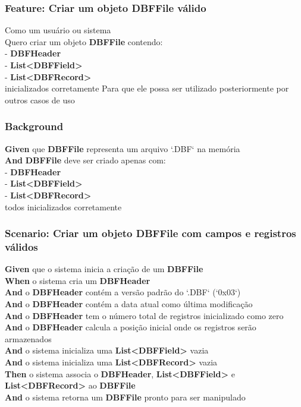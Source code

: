 \subsubsection{Feature: Criar um objeto DBFFile válido}
Como um usuário ou sistema \\
Quero criar um objeto \textbf{DBFFile} contendo: \\
- \textbf{DBFHeader}\\
- \textbf{List<DBFField>} \\
- \textbf{List<DBFRecord>}\\
inicializados corretamente Para que ele possa ser utilizado posteriormente por outros casos de uso \\

\subsubsection{Background}
\textbf{Given} que \textbf{DBFFile} representa um arquivo `.DBF` na memória \\
\textbf{And} \textbf{DBFFile} deve ser criado apenas com: \\
- \textbf{DBFHeader} \\
- \textbf{List<DBFField>}\\
- \textbf{List<DBFRecord>}\\
todos inicializados corretamente

\subsubsection{Scenario: Criar um objeto DBFFile com campos e registros válidos}
\textbf{Given} que o sistema inicia a criação de um \textbf{DBFFile} \\
\textbf{When} o sistema cria um \textbf{DBFHeader} \\
\textbf{And} o \textbf{DBFHeader} contém a versão padrão do `.DBF` (`0x03`) \\
\textbf{And} o \textbf{DBFHeader} contém a data atual como última modificação \\
\textbf{And} o \textbf{DBFHeader} tem o número total de registros inicializado como zero \\
\textbf{And} o \textbf{DBFHeader} calcula a posição inicial onde os registros serão armazenados \\
\textbf{And} o sistema inicializa uma \textbf{List<DBFField>} vazia \\
\textbf{And} o sistema inicializa uma \textbf{List<DBFRecord>} vazia \\
\textbf{Then} o sistema associa o \textbf{DBFHeader}, \textbf{List<DBFField>} e \textbf{List<DBFRecord>} ao \textbf{DBFFile} \\
\textbf{And} o sistema retorna um \textbf{DBFFile} pronto para ser manipulado \\

